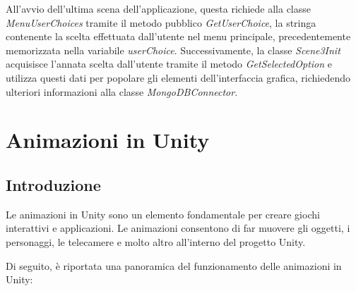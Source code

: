 All'avvio dell'ultima scena dell'applicazione, questa richiede alla classe \textit{MenuUserChoices} tramite il metodo pubblico \textit{GetUserChoice}, la stringa contenente la scelta effettuata dall'utente nel menu principale, precedentemente memorizzata nella variabile \textit{userChoice}. Successivamente, la classe \textit{Scene3Init} acquisisce l'annata scelta dall'utente tramite il metodo \textit{GetSelectedOption} e utilizza questi dati per popolare gli elementi dell'interfaccia grafica, richiedendo ulteriori informazioni alla classe \textit{MongoDBConnector}.


\section{Animazioni in Unity}

\subsection{Introduzione}

Le animazioni in Unity sono un elemento fondamentale per creare giochi interattivi e applicazioni. Le animazioni consentono di far muovere gli oggetti, i personaggi, le telecamere e molto altro all'interno del progetto Unity.

Di seguito, è riportata una panoramica del funzionamento delle animazioni in Unity:

